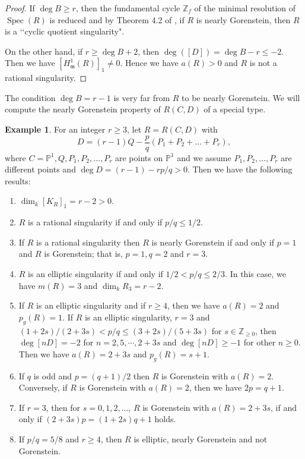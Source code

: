 \documentclass[12pt]{amsart}
\theoremstyle{definition}
\newtheorem{ex}[thm]{Example}
\theoremstyle{remark}
\numberwithin{equation}{section}
\DeclareMathOperator{\Spec}{Spec}
\newcommand{\m}{\mathfrak m}
\newcommand{\PP}{\mathbb P}
\newcommand{\Z}{\mathbb Z}
\renewcommand{\:}{\colon}
\begin{document}
\begin{proof} If $\deg B \ge r$, then the fundamental cycle $\Z_f$ of the minimal resolution 
of $\Spec(R)$ is reduced and by Theorem 4.2 of \cite{MOWY}, if $R$ is nearly Gorenstein, then 
$R$ is a \lq\lq cyclic quotient singularity". 
\par 
On the other hand, if $r\ge \deg B+2$, 
then $\deg ([D]) = \deg B - r\le -2$. 
Then we have $[H^1_{\m}(R)]_{1}\ne 0$. 
Hence we have $a(R) > 0$ and $R$ is not a rational singularity. 
\end{proof}

\par 
The condition $\deg B = r-1$ is very far from $R$ to be nearly Gorenstein. 
We will compute the nearly Gorenstein property of $R(C,D)$ of a special type. 


\begin{ex} For an integer $r\ge 3$, let $R=R(C,D)$ with 
\[D = (r-1)Q - \dfrac{p}{q} (P_1+P_2+\ldots + P_r),\]
where $C=\PP^1, Q, P_1, P_2, \ldots,  P_r$ are points on $\PP^1$ and we assume 
$P_1, P_2, \ldots,   P_r$ are different points and 
$\deg D = (r-1)- r p/q >0$. Then we have the following results:
\begin{enumerate}
\item $\dim_k [K_R]_1 = r-2 >0$.
\item $R$ is a rational singularity if and only if $p/q \le 1/2$. 
\item If $R$ is a rational singularity then $R$ is nearly Gorenstein
 if and only if $p=1$ and $R$ is Gorenstein; 
that is, $p=1, q=2$ and $r=3$. 
\item  $R$ is an elliptic singularity if and only if 
$1/2 < p/q \le 2/3$. In this case, 
we have $m(R)=3$ and $\dim_k R_3 = r-2$.  
\item If $R$ is an elliptic singularity and if $r\ge 4$, 
then we have $a(R)=2$ and $p_g(R)=1$. If $R$ is an elliptic singularity, 
$r=3$ and $(1+2s)/(2+3s) < p/q \le (3+2s)/(5+3s)$ for 
$s\in \Z_{\ge 0}$, then $\deg[nD]=-2$ for 
$n= 2, 5, \cdots , 2+3s$ and $\deg[nD]\ge -1$ for other $n\ge 0$. 
Then we have $a(R)= 2+3s$ and $p_g(R)= s+1$.  
\item  If $q$ is odd and $p=(q+1)/2$ then $R$ is Gorenstein with $a(R)=2$.  
Conversely, if $R$ is Gorenstein with $a(R)=2$, then we have $2p=q+1$. 
\item If $r=3$, then for $s=0,1,2,\ldots$,  $R$ is Gorenstein with 
$a(R)= 2+3s$, if and only if $(2+3s)p=(1+2s)q+1$ holds. 
\item  If $p/q = 5/8$ and $r\ge 4$, then $R$ is elliptic, nearly Gorenstein  
and not Gorenstein.  
\end{enumerate} 
\end{ex} 
\end{document}
